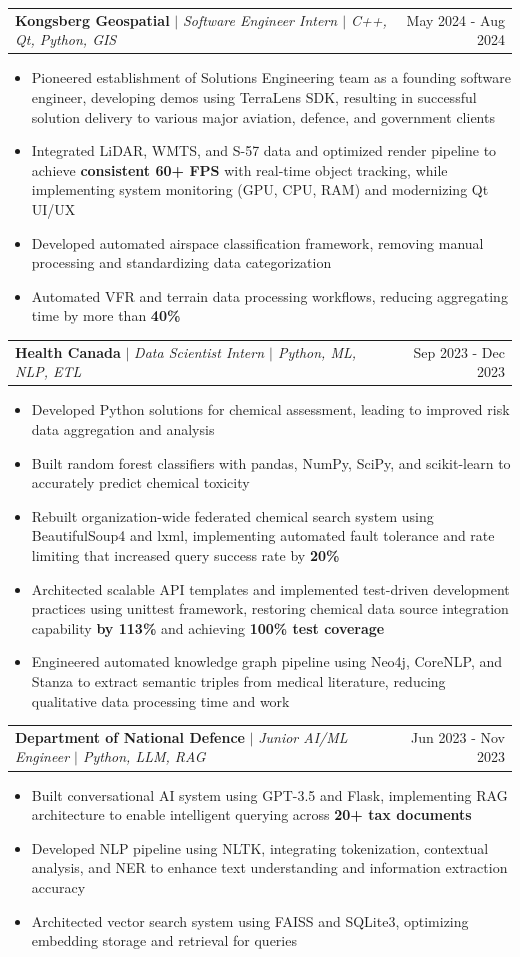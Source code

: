\documentclass[letterpaper,10pt]{article}
\makeatletter
\newcommand{\resumeItem}[1]{
  \item\small{
    {#1 \vspace{-3.5pt}}
  }
}
\newcommand{\resumeSubheading}[3]{
    \item
    \begin{tabular*}{0.97\textwidth}[t]{l@{\extracolsep{\fill}}r}
      \textbf{#1} $|$ \textit{ #2} & #3 \\
    \end{tabular*}\vspace{-7pt}
}
\newcommand{\resumeItemListStart}{\begin{itemize}}
\newcommand{\resumeItemListEnd}{\end{itemize}\vspace{-5pt}}
\makeatother
\begin{document}
    \resumeSubheading{Kongsberg Geospatial}{Software Engineer Intern $|$ C++, Qt, Python, GIS}{May 2024 - Aug 2024}
      \resumeItemListStart
        \resumeItem{Pioneered establishment of Solutions Engineering team as a founding software engineer, developing demos using TerraLens SDK, resulting in successful solution delivery to various major aviation, defence, and government clients}
        \resumeItem{Integrated LiDAR, WMTS, and S-57 data and optimized render pipeline to achieve \textbf{consistent 60+ FPS} with real-time object tracking, while implementing system monitoring (GPU, CPU, RAM) and modernizing Qt UI/UX}
        \resumeItem{Developed automated airspace classification framework, removing manual processing and standardizing data categorization}
        \resumeItem{Automated VFR and terrain data processing workflows, reducing aggregating time by more than \textbf{40\%}}
      \resumeItemListEnd

    \resumeSubheading{Health Canada}{Data Scientist Intern $|$ Python, ML, NLP, ETL}{Sep 2023 - Dec 2023}
      \resumeItemListStart
        \resumeItem{Developed Python solutions for chemical assessment, leading to improved risk data aggregation and analysis}
        \resumeItem{Built random forest classifiers with pandas, NumPy, SciPy, and scikit-learn to accurately predict chemical toxicity}
        \resumeItem{Rebuilt organization-wide federated chemical search system using BeautifulSoup4 and lxml, implementing automated fault tolerance and rate limiting that increased query success rate by \textbf{20\%}}
        \resumeItem{Architected scalable API templates and implemented test-driven development practices using unittest framework, restoring chemical data source integration capability \textbf{by 113\%} and achieving \textbf{100\% test coverage}}
        \resumeItem{Engineered automated knowledge graph pipeline using Neo4j, CoreNLP, and Stanza to extract semantic triples from medical literature, reducing qualitative data processing time and work}
      \resumeItemListEnd

    \resumeSubheading{Department of National Defence}{Junior AI/ML Engineer $|$ Python, LLM, RAG}{Jun 2023 - Nov 2023}
      \resumeItemListStart
        \resumeItem{Built conversational AI system using GPT-3.5 and Flask, implementing RAG architecture to enable intelligent querying across \textbf{20+ tax documents}}
        \resumeItem{Developed NLP pipeline using NLTK, integrating tokenization, contextual analysis, and NER to enhance text understanding and information extraction accuracy}
        \resumeItem{Architected vector search system using FAISS and SQLite3, optimizing embedding storage and retrieval for queries}
      \resumeItemListEnd
\end{document}
